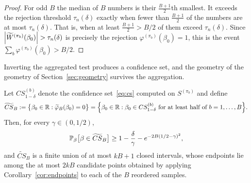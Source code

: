 \begin{proof}
    For odd $B$ the median of $B$ numbers is their $\tfrac{B+1}{2}$th smallest. It exceeds the rejection threshold $\tau_n(\delta)$ exactly when fewer than $\tfrac{B+1}{2}$ of the numbers are at most $\tau_n(\delta)$. That is, when at least $\tfrac{B+1}{2} > B/2$ of them exceed $\tau_n(\delta)$. Since $\left|\widetilde{W}^{(\pi_b)}(\beta_0)\right| > \tau_n(\delta)$ is precisely the rejection $\varphi^{(\pi_b)}(\beta_0) = 1$, this is the event $\sum_b \varphi^{(\pi_b)}(\beta_0) > B/2$.
\end{proof}


Inverting the aggregated test produces a confidence set, and the geometry of the geometry of Section~\ref{sec:geometry} survives the aggregation.

\begin{corollary}
\label{cor:agg_cs}
    Let $CS^{(b)}_{1-\delta}$ denote the confidence set~\eqref{eq:cs} computed on $S^{(\pi_b)}$ and define
    \[
        \widetilde{CS}_B
        := \bigl\{\beta_0 \in \mathbb{R} : \widetilde{\varphi}_B(\beta_0) = 0\bigr\}
        = \Bigl\{\beta_0 \in \mathbb{R} : \beta_0 \in CS^{(b)}_{1-\delta} \text{ for at least half of } b = 1,\dots,B\Bigr\}.
    \]
    Then, for every $\gamma \in (0,1/2)$,
    \begin{equation}
    \label{eq:agg_coverage}
        \operatorname{\mathbb{P}}_\beta\bigl[\beta \in \widetilde{CS}_B\bigr]
        \geq 1 - \frac{\delta}{\gamma} - e^{-2B(1/2-\gamma)^2},
    \end{equation}
    and $\widetilde{CS}_B$ is a finite union of at most $kB+1$ closed intervals, whose endpoints lie among the at most $2kB$ candidate points obtained by applying Corollary~\ref{cor:endpoints} to each of the $B$ reordered samples.
\end{corollary}

